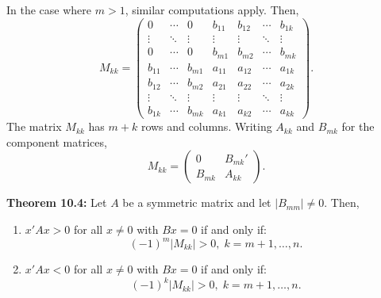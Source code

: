 \begin{original}
In the case where $m > 1$, similar computations apply. Then,
\[
M_{kk} = \begin{pmatrix}
0 & \cdots & 0 & b_{11} & b_{12} & \cdots & b_{1k} \\
\vdots & \ddots & \vdots & \vdots & \vdots & \ddots & \vdots \\
0 & \cdots & 0 & b_{m1} & b_{m2} & \cdots & b_{mk} \\
b_{11} & \cdots & b_{m1} & a_{11} & a_{12} & \cdots & a_{1k} \\
b_{12} & \cdots & b_{m2} & a_{21} & a_{22} & \cdots & a_{2k} \\
\vdots & \ddots & \vdots & \vdots & \vdots & \ddots & \vdots \\
b_{1k} & \cdots & b_{mk} & a_{k1} & a_{k2} & \cdots & a_{kk}
\end{pmatrix}.
\]
The matrix $M_{kk}$ has $m+k$ rows and columns. Writing $A_{kk}$ and $B_{mk}$ for the component matrices,
\[
M_{kk} = \begin{pmatrix} 0 & B_{mk}' \\ B_{mk} & A_{kk} \end{pmatrix}.
\]

\textbf{Theorem 10.4:} Let $A$ be a symmetric matrix and let $|B_{mm}| \neq 0$. Then,
\begin{enumerate}
\item $x'Ax > 0$ for all $x \neq 0$ with $Bx = 0$ if and only if:
\[
(-1)^m|M_{kk}| > 0,\; k = m+1, \ldots, n.
\]
\item $x'Ax < 0$ for all $x \neq 0$ with $Bx = 0$ if and only if:
\[
(-1)^k|M_{kk}| > 0,\; k = m+1, \ldots, n.
\]
\end{enumerate}
\end{original}
